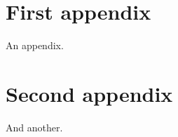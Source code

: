 \lipsum[1-5]


\namedsubappendices
\begin{subappendices}

\section{First appendix}
An appendix. 

\section{Second appendix}
And another. 

 \end{subappendices}

